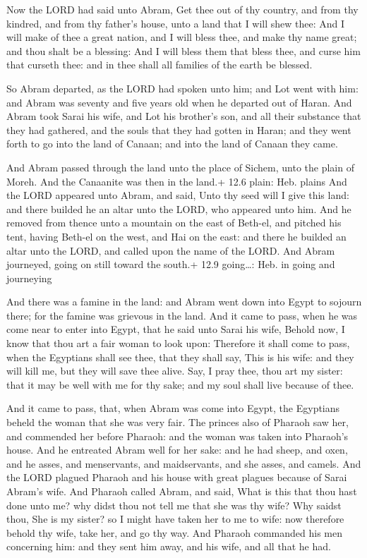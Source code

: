  Now the LORD had said unto Abram, Get thee out of thy
country, and from thy kindred, and from thy father's house, unto a land
that I will shew thee:  And I will make of thee a great
nation, and I will bless thee, and make thy name great; and thou shalt
be a blessing:  And I will bless them that bless thee, and
curse him that curseth thee: and in thee shall all families of the earth
be blessed.

 So Abram departed, as the LORD had spoken unto him; and Lot
went with him: and Abram was seventy and five years old when he departed
out of Haran.  And Abram took Sarai his wife, and Lot his
brother's son, and all their substance that they had gathered, and the
souls that they had gotten in Haran; and they went forth to go into the
land of Canaan; and into the land of Canaan they came.

 And Abram passed through the land unto the place of
Sichem, unto the plain of Moreh. And the Canaanite was then in the
land.+ 12.6 plain: Heb. plains  And the LORD appeared unto
Abram, and said, Unto thy seed will I give this land: and there builded
he an altar unto the LORD, who appeared unto him.  And he
removed from thence unto a mountain on the east of Beth-el, and pitched
his tent, having Beth-el on the west, and Hai on the east: and there he
builded an altar unto the LORD, and called upon the name of the LORD.
 And Abram journeyed, going on still toward the south.+ 12.9
going\ldots: Heb. in going and journeying

 And there was a famine in the land: and Abram went down
into Egypt to sojourn there; for the famine was grievous in the land.
 And it came to pass, when he was come near to enter into
Egypt, that he said unto Sarai his wife, Behold now, I know that thou
art a fair woman to look upon:  Therefore it shall come to
pass, when the Egyptians shall see thee, that they shall say, This is
his wife: and they will kill me, but they will save thee alive.
 Say, I pray thee, thou art my sister: that it may be well
with me for thy sake; and my soul shall live because of thee.

 And it came to pass, that, when Abram was come into
Egypt, the Egyptians beheld the woman that she was very fair.
 The princes also of Pharaoh saw her, and commended her
before Pharaoh: and the woman was taken into Pharaoh's house.
 And he entreated Abram well for her sake: and he had
sheep, and oxen, and he asses, and menservants, and maidservants, and
she asses, and camels.  And the LORD plagued Pharaoh and
his house with great plagues because of Sarai Abram's wife.
 And Pharaoh called Abram, and said, What is this that thou
hast done unto me? why didst thou not tell me that she was thy wife?
 Why saidst thou, She is my sister? so I might have taken
her to me to wife: now therefore behold thy wife, take her, and go thy
way.  And Pharaoh commanded his men concerning him: and
they sent him away, and his wife, and all that he had.

